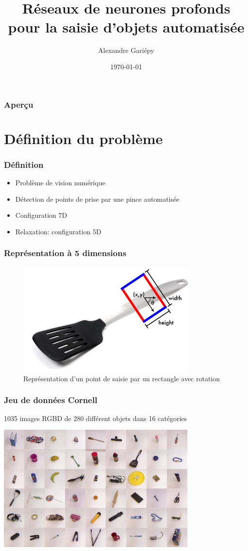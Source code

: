 \documentclass{beamer}
\title[Réseaux de neurones pour saisie automatique]{Réseaux de neurones profonds pour la saisie d'objets automatisée}
\author{Alexandre Gariépy}
\institute[ulaval] 
{
Université Laval \\
\medskip
\textit{alexandre.gariepy.2@ulaval.ca}
}
\date{\today}
\begin{document}
\begin{frame}
\titlepage
\end{frame}

\begin{frame}
\frametitle{Aperçu}
\tableofcontents 
\end{frame}

\section{Définition du problème}
\begin{frame}
  \frametitle{Définition}
  \begin{itemize}
  \item Problème de vision numérique
  \item Détection de points de prise par une pince automatisée
  \item Configuration 7D
  \item Relaxation: configuration 5D
  \end{itemize}
  
\end{frame}

\begin{frame}
  \frametitle{Représentation à 5 dimensions}
  \begin{figure}
    \centering
    \includegraphics[width=0.8\textwidth]{img/grasp_rectangle.png}
    \caption{Représentation d'un point de saisie par un rectangle avec rotation}
    \label{fig:grasp_rect}
  \end{figure}
\end{frame}

\begin{frame}
  \frametitle{Jeu de données Cornell}
  1035 images RGBD de 280 différent objets dans 16 catégories
  \begin{center}
  \includegraphics[width=0.75\textwidth]{img/cornell.png}
  \end{center}
\end{frame}
\end{document}
